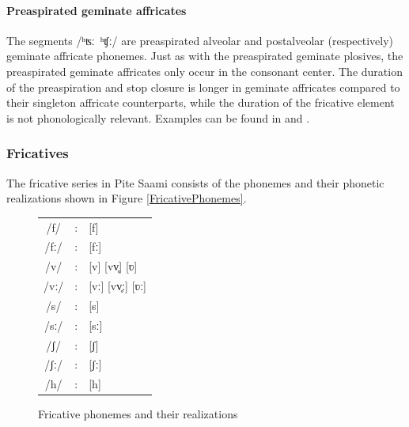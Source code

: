 \paragraph{Preaspirated geminate affricates}
The segments \mbox{/ʰʦː ʰʧː/} are preaspirated alveolar and postalveolar (respectively) geminate affricate phonemes. 
Just as with the preaspirated geminate plosives, the preaspirated geminate affricates only occur in the consonant center. The duration of the preaspiration and stop closure is longer in geminate affricates compared to their singleton affricate counterparts, while the duration of the fricative element is not phonologically relevant. 
Examples can be found in  and .


\subsubsection{Fricatives}\label{Fricatives}
The fricative series in Pite Saami consists of the phonemes and their phonetic realizations shown in Figure \vref{FricativePhonemes}. %
\begin{figure}[h]\centering
\begin{tabular}{c c l}
/f/ &:& [f] \\ %
/fː/ &:& [fː] \\ %
/v/ &:& [v] [vv̥] [ʋ] \\ %
/vː/ &:& [vː] [vv̥ː] [ʋː] \\ %
/s/ &:& [s] \\ %
/sː/ &:& [sː] \\ %
/ʃ/ &:& [ʃ] \\ %
/ʃː/ &:& [ʃː] \\ %
/h/ &:& [h] \\ %
\end{tabular}
\caption{Fricative phonemes and their realizations}\label{FricativePhonemes}
\end{figure}

